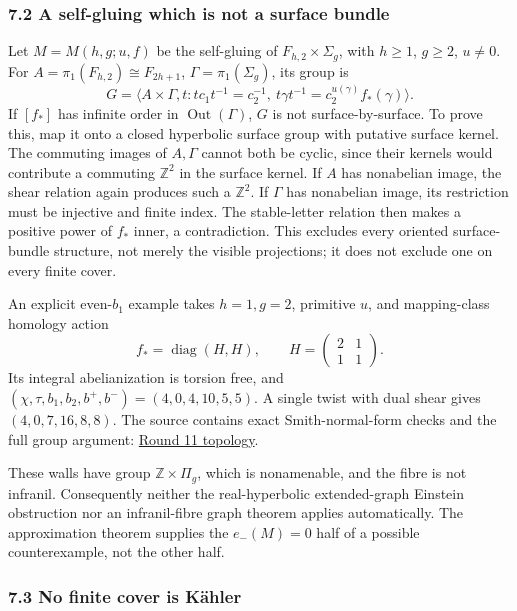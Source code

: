 \documentclass[
  english,
]{article}
\begin{document}
\hypertarget{a-self-gluing-which-is-not-a-surface-bundle}{%
\subsubsection{7.2 A self-gluing which is not a surface
bundle}\label{a-self-gluing-which-is-not-a-surface-bundle}}

Let \(M=M(h,g;u,f)\) be the self-gluing of \(F_{h,2}\times\Sigma_g\),
with \(h\ge1\), \(g\ge2\), \(u\ne0\). For
\(A=\pi_1(F_{h,2})\cong F_{2h+1}\), \(\Gamma=\pi_1(\Sigma_g)\), its
group is \[
 G=\langle A\times\Gamma,t:
 tc_1t^{-1}=c_2^{-1},\
 t\gamma t^{-1}=c_2^{u(\gamma)}f_*(\gamma)\rangle.
\] If \([f_*]\) has infinite order in \(\operatorname{Out}(\Gamma)\),
\(G\) is not surface-by-surface. To prove this, map it onto a closed
hyperbolic surface group with putative surface kernel. The commuting
images of \(A,\Gamma\) cannot both be cyclic, since their kernels would
contribute a commuting \(\mathbb Z^2\) in the surface kernel. If \(A\)
has nonabelian image, the shear relation again produces such a
\(\mathbb Z^2\). If \(\Gamma\) has nonabelian image, its restriction
must be injective and finite index. The stable-letter relation then
makes a positive power of \(f_*\) inner, a contradiction. This excludes
every oriented surface-bundle structure, not merely the visible
projections; it does not exclude one on every finite cover.

An explicit even-\(b_1\) example takes \(h=1,g=2\), primitive \(u\), and
mapping-class homology action \[
 f_*=\operatorname{diag}(H,H),\qquad H=\begin{pmatrix}2&1\\1&1\end{pmatrix}.
\] Its integral abelianization is torsion free, and
\((\chi,\tau,b_1,b_2,b^+,b^-)=(4,0,4,10,5,5)\). A single twist with dual
shear gives \((4,0,7,16,8,8)\). The source contains exact
Smith-normal-form checks and the full group argument:
\href{../proofs/round11_graph_topology.md}{Round 11 topology}.

These walls have group \(\mathbb Z\times\Pi_g\), which is nonamenable,
and the fibre is not infranil. Consequently neither the real-hyperbolic
extended-graph Einstein obstruction nor an infranil-fibre graph theorem
applies automatically. The approximation theorem supplies the
\(e_-(M)=0\) half of a possible counterexample, not the other half.

\hypertarget{no-finite-cover-is-kuxe4hler}{%
\subsubsection{7.3 No finite cover is
Kähler}\label{no-finite-cover-is-kuxe4hler}}
\end{document}
